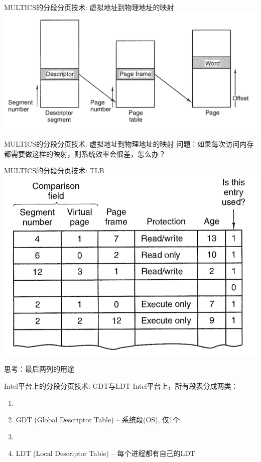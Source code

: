 \documentclass[xcolor=svgnames]{beamer}
\begin{document}
\begin{CJK*}{UTF8}{gbsn}
\begin{frame}{MULTICS的分段分页技术: 虚拟地址到物理地址的映射}
\includegraphics[width=1.0\textwidth]{seg4.png}
\end{frame}

\begin{frame}{MULTICS的分段分页技术: 虚拟地址到物理地址的映射}
\alert{问题：}如果每次访问内存都需要做这样的映射，则系统效率会很差，怎么办？
\end{frame}

\begin{frame}{MULTICS的分段分页技术: TLB}
\includegraphics[width=1.0\textwidth]{tlb2.png}

思考：最后两列的用途
\end{frame}

\begin{frame}{Intel平台上的分段分页技术: GDT与LDT}
Intel平台上，所有段表分成两类：
\begin{enumerate}
\item[]
\item GDT (Global Descriptor Table) -- 系统段(OS), 仅1个
\item[]
\item LDT (Local Descriptor Table) -- 每个进程都有自己的LDT
\end{enumerate}
\end{frame}


\end{CJK*}
\end{document}
